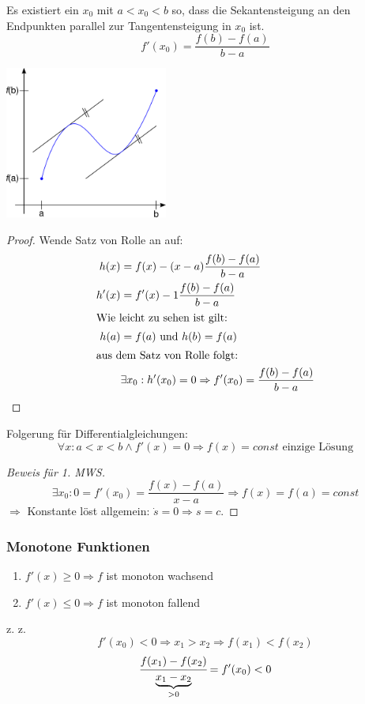 \begin{theorem}
Es existiert ein $x_0$ mit $a < x_0 < b$ so, dass die Sekantensteigung an den Endpunkten parallel zur Tangentensteigung in $x_0$ ist.
\begin{equation*}
	f'(x_0) = \frac{f(b) - f(a)}{b - a}
\end{equation*}
\end{theorem}
\begin{center}
	\includegraphics[width=0.4\textwidth]{include/20091201-3.pdf}
\end{center}
\begin{proof}
	Wende Satz von Rolle an auf:
	\begin{align*}
		h(x) &= f(x) - (x - a)\frac{f(b) - f(a)}{b - a} \\
		h'(x) &= f'(x) - 1\frac{f(b) - f(a)}{b - a} \\
		\intertext{Wie leicht zu sehen ist gilt:}
		h(a) &= f(a)\text{ und }h(b) = f(a) \\
		\intertext{aus dem Satz von Rolle folgt:}
		&\exists x_0 : h'(x_0) = 0 \Rightarrow f'(x_0) = \frac{f(b) - f(a)}{b - a}
	\end{align*}
\end{proof}
Folgerung für Differentialgleichungen:
\begin{equation*}
	\forall x : a < x < b \land f'(x) = 0 \Rightarrow f(x) = const \text{ einzige Lösung}
\end{equation*}
\begin{proof}[Beweis für 1. MWS]
	\begin{equation*}
		\exists x_0 : 0 = f'(x_0) = \frac{f(x) - f(a)}{x - a} \Rightarrow f(x) = f(a) = const
	\end{equation*}
	$\Rightarrow$ Konstante löst allgemein: $\dot s = 0 \Rightarrow s = c$.
\end{proof}

\subsubsection*{Monotone Funktionen}
\begin{enumerate}
	\item $f'(x) \geq 0 \Rightarrow f$ ist monoton wachsend
	\item $f'(x) \leq 0 \Rightarrow f$ ist monoton fallend
\end{enumerate}
\begin{example}
	z. z. \[f'(x_0) < 0 \Rightarrow x_1 > x_2 \Rightarrow f(x_1) < f(x_2)\]
	\[\cfrac{f(x_1) - f(x_2)}{\underbrace{x_1 - x_2}_{> 0}} = f'(x_0) < 0\]
\end{example}

